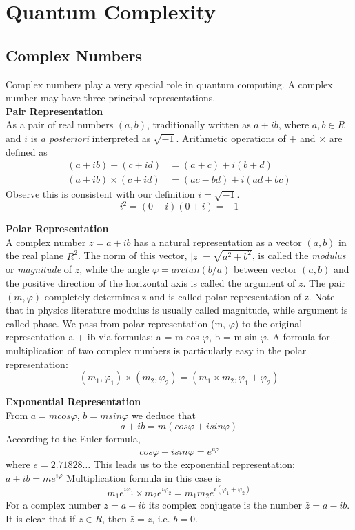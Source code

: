 \section{Quantum Complexity}
\subsection{Complex Numbers}
Complex numbers play a very special role in quantum computing.
A complex number may have three principal representations.\\

\textbf{Pair Representation}\\
As a pair of real numbers $(a, b)$, traditionally written as $a + ib$,
where $a, b \in R$ and $i$ is \textit{a posteriori} interpreted as $\sqrt{-1}$.
Arithmetic operations of $+$ and $\times$ are defined as
\begin{align*}
    (a+ib) +      (c+id) &= (a+c)   + i(b+d)  \\
    (a+ib) \times (c+id) &= (ac−bd) + i(ad+bc)
\end{align*}
Observe this is consistent with our definition $i=\sqrt{-1}$.
$$i^2 = (0 + i)(0 + i) = −1$$

\textbf{Polar Representation}\\
A complex number $z = a + ib$ has a natural representation
as a vector $(a,b)$ in the real plane $R^2$.
The norm of this vector, $|z| = \sqrt{a^2 +b^2}$,
is called the \textit{modulus} or \textit{magnitude} of $z$,
while the angle $\varphi = arctan(b/a)$ between vector $(a, b)$
and the positive direction of the horizontal axis is called the argument of $z$.
The pair $(m,\varphi)$ completely determines z and is called polar representation of z.
Note that in physics literature modulus is usually called magnitude, while argument is called phase.
We pass from polar representation (m, $\varphi$) to the original representation a + ib via formulas:
a = m cos $\varphi$, b = m sin $\varphi$.
A formula for multiplication of two complex numbers is particularly
easy in the polar representation:
$$(m_1, \varphi_1) \times (m_2, \varphi_2) = (m_1 \times m_2, \varphi_1 + \varphi_2)$$

\textbf{Exponential Representation}\\
From $a = m cos \varphi$, $b = m sin \varphi$ we deduce that
$$a + ib = m(cos\varphi + isin\varphi)$$
According to the Euler formula,
$$cos\varphi + isin\varphi = e^{i\varphi}$$
where $e = 2.71828\dots$
This leads us to the exponential representation:
$a + ib = me^{i\varphi}$
Multiplication formula in this case is
$$m_1e^{i\varphi_1} \times m_2e^{i\varphi_2} = m_1m_2e^{i(\varphi_1+\varphi_2)}$$
For a complex number $z = a + ib$ its complex conjugate is the number $\bar{z} = a − ib$.
It is clear that if $z \in R$, then $\bar{z} = z$, i.e. $b = 0$.

